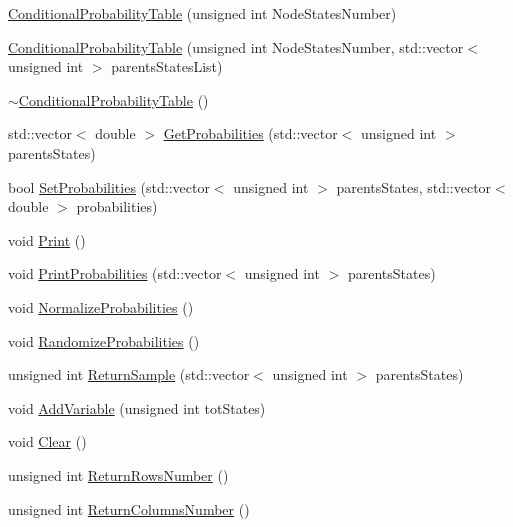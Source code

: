 \begin{DoxyCompactItemize}
\item 
\hyperlink{classbayonet_1_1_conditional_probability_table_a58abcca6946f80bfe3c86ccbbdeed31e}{Conditional\-Probability\-Table} (unsigned int Node\-States\-Number)
\item 
\hyperlink{classbayonet_1_1_conditional_probability_table_af83db269bcfc340658801d5e473ad5c8}{Conditional\-Probability\-Table} (unsigned int Node\-States\-Number, std\-::vector$<$ unsigned int $>$ parents\-States\-List)
\item 
\hyperlink{classbayonet_1_1_conditional_probability_table_a5fd07eba1d571bf8f8bac3014f2409b2}{$\sim$\-Conditional\-Probability\-Table} ()
\item 
std\-::vector$<$ double $>$ \hyperlink{classbayonet_1_1_conditional_probability_table_a7612e2c40e51eaf4d94109adb2bd269d}{Get\-Probabilities} (std\-::vector$<$ unsigned int $>$ parents\-States)
\item 
bool \hyperlink{classbayonet_1_1_conditional_probability_table_ac94cd225747e8f59c5497b860ff777c0}{Set\-Probabilities} (std\-::vector$<$ unsigned int $>$ parents\-States, std\-::vector$<$ double $>$ probabilities)
\item 
void \hyperlink{classbayonet_1_1_conditional_probability_table_a0815f7814cc5797629035f17f0cf26c2}{Print} ()
\item 
void \hyperlink{classbayonet_1_1_conditional_probability_table_a0ca5c1cbfeb5c86ef06161a810233b2a}{Print\-Probabilities} (std\-::vector$<$ unsigned int $>$ parents\-States)
\item 
void \hyperlink{classbayonet_1_1_conditional_probability_table_a600256d28edeef688ab4cdf38794acc3}{Normalize\-Probabilities} ()
\item 
void \hyperlink{classbayonet_1_1_conditional_probability_table_a224d882019f784a993c50043dca4cb5d}{Randomize\-Probabilities} ()
\item 
unsigned int \hyperlink{classbayonet_1_1_conditional_probability_table_a3e600c4b5247dd52a5d0e775ca898c69}{Return\-Sample} (std\-::vector$<$ unsigned int $>$ parents\-States)
\item 
void \hyperlink{classbayonet_1_1_conditional_probability_table_a038e1940c40528ac23101272f33f752c}{Add\-Variable} (unsigned int tot\-States)
\item 
void \hyperlink{classbayonet_1_1_conditional_probability_table_a1708d2e94833fe8e0c37e661269dc11d}{Clear} ()
\item 
unsigned int \hyperlink{classbayonet_1_1_conditional_probability_table_ae2b35a361fb92684abdfde96887b24e6}{Return\-Rows\-Number} ()
\item 
unsigned int \hyperlink{classbayonet_1_1_conditional_probability_table_a2fef41dbe55cbccc82b3921d4d471c1d}{Return\-Columns\-Number} ()
\end{DoxyCompactItemize}



